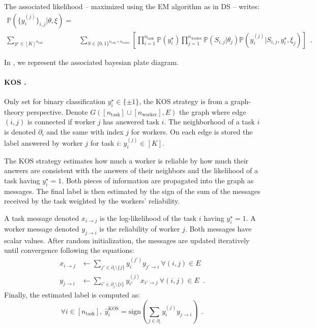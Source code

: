The associated likelihood -- maximized using the EM algorithm as in DS -- writes:
\begin{align*}
\mathbb{P}(\{y_i^{(j)}\}_{i,j}|\theta,\xi) =& \\ \sum_{y^\star\in [K]^{n_\text{task}}}&\sum_{S\in\{0,1\}^{n_\text{task}\times n_\text{worker}}}\left[\prod_{i=1}^{n_\text{task}} \mathbb{P}(y^\star_i) \prod_{j=1}^{n_\text{worker}} \mathbb{P}(S_{i,j}|\theta_j)\mathbb{P}(y_i^{(j)}|S_{i,j},y_i^\star, \xi_j)\right]\enspace.
\end{align*}

In , we represent the associated bayesian plate diagram.

\paragraph{KOS \citep{karger2011iterative}.}
Only set for binary classification $y_i^\star\in\{\pm 1\}$, the KOS strategy is from a graph-theory perspective.
Denote $G([n_\text{task}]\cup [n_\text{worker}], E)$ the graph where edge $(i,j)$ is connected if worker $j$ has answered task $i$. The neighborhood of a task $i$ is denoted $\partial_i$ and the same with index $j$ for workers.
On each edge is stored the label answered by worker $j$ for task $i$: $y_i^{(j)}\in[K]$.

The KOS strategy estimates how much a worker is reliable by how much their answers are consistent with the answers of their neighbors and the likelihood of a task having $y_i^\star=1$.
Both pieces of information are propagated into the graph as messages.
The final label is then estimated by the sign of the sum of the messages received by the task weighted by the workers' reliability.

A task message denoted $x_{i\rightarrow j}$ is the log-likelihood of the task $i$ having $y_i^\star=1$.
A worker message denoted $y_{j\rightarrow i}$ is the reliability of worker $j$.
Both messages have scalar values.
After random initialization, the messages are updated iteratively until convergence following the equations:
\begin{align*}
    x_{i\rightarrow j} &\gets \sum_{j'\in \partial_i\setminus \{j\}} y_i^{(j')}y_{j'\rightarrow i} \ \forall (i,j)\in E \\
    y_{j\rightarrow i} &\gets \sum_{i'\in \partial_j\setminus \{i\}} y_{i'}^{(j)} x_{i'\rightarrow j} \ \forall (i,j)\in E\enspace.
\end{align*}
Finally, the estimated label is computed as:
\[
\forall i\in [n_\text{task}],\ \hat y_i^{\text{KOS}} = \mathrm{sign}\left(\sum_{j\in\partial_i} y_i^{(j)}y_{j\rightarrow i}\right)\enspace.
\]

